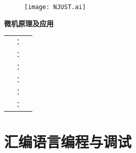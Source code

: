 \documentclass{ctexart}
\newif\ifOne\Onefalse
\begin{document}

\begin{titlepage}
	\centering
	\begin{figure}[htpb]
		\centering
		\texttt{[image: NJUST.ai]}
		\label{fig:NJUST}
	\end{figure}

	\vspace{20mm}

	\textbf{\heiti{}微机原理及应用}

	\vspace{5mm}

	\textbf{\heiti{}}

	\vspace{20mm}

	\begin{table}[htpb]
		\centering
		\begin{tabu}to.8
			&：&\underline{}\\
			&：&\underline{}\\
			&：&\underline{}\\
			&：&\underline{}\\
			&：&\underline{}\\
			&：&\underline{\makebox[12\ccwd][c]{}}\\
		\end{tabu}
	\end{table}

	\vspace{10mm}
	\kaishu{\today}
\end{titlepage}

\pagestyle{fancy}
\renewcommand{\headrulewidth}{0pt}
\lhead{}
\chead{}
\rhead{}
\lfoot{\small{\leftmark}}
\rfoot{\small{\rightmark}}


\ifOne
	\section{汇编语言编程与调试}%
	\label{sec:汇编语言编程与调试}
\end{document}
